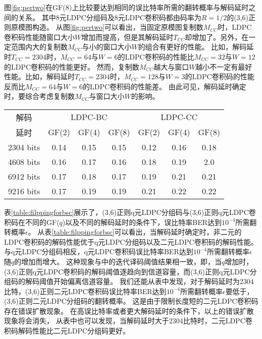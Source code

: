 图\ref{fig:pertwo}在GF($8$)上比较要达到相同的误比特率所需的翻转概率与解码延时之间的关系。
其中8元LDPC分组码及8元LDPC卷积码都由码率为$R=1/2$的(3,6)正则原模图构造。
从图\ref{fig:pertwo}可以看出，当固定原模图复制数$M_{CC}$时，LDPC卷积码性能随窗口大小$W$增加而提高，但是其解码延时$T_{CC}$却增加了。另外，在一定范围内大的复制数$M_{CC}$与小的窗口大小$W$的组合有更好的性能。
比如，解码延时$T_{CC}=2304$时，$M_{CC}=64$与$W=6$的LDPC卷积码的性能比$M_{CC}=32$与$W=12$的LDPC卷积码的性能更好。
然而，复制数$M_{CC}$越大与窗口$W$越小不一定有最好性能。比如，解码延时$T_{CC}=2304$时，$M_{CC}=128$与$W=3$的LDPC卷积码的性能反而比$M_{CC}=64$与$W=6$的LDPC卷积码的性能差。
由此可见，解码延时确定时，要综合考虑复制数$M_{CC}$与窗口大小$W$的影响。
\begin{center}
\label{table:filppingforbsc}
\begin{tabular}{|c|c|c|c|c|c|c|}
 \hline
解码 & \multicolumn{3}{|c|}{LDPC-BC} & \multicolumn{3}{|c|}{LDPC-CC} \\ \cline{2-7}
延时 & GF(2) & GF(4) & GF(8) & GF(2) & GF(4) & GF(8) \\ \hline
2304 bits & 0.14 & 0.15 & 0.15 & 0.12 & 0.16 & 0.18\\ \hline
4608 bits & 0.16 & 0.17 & 0.16 & 0.18 & 0.19 & 2.0\\ \hline
6912 bits & 0.17 & 0.18 & 0.17 & 0.19 & 0.21 & 0.21\\ \hline
9216 bits & 0.17 & 0.19 & 0.19 & 0.21 & 0.22 & 0.22\\ \hline
\end{tabular}
\end{center}

表\ref{table:filppingforbsc}展示了，(3,6)正则q元LDPC分组码与(3,6)正则q元LDPC卷积码在不同的GF($q$)以及不同的解码延时的条件下，误比特率BER达到$10^{-4}$所需翻转概率$\epsilon$。
从表\ref{table:filppingforbsc}可以看出，当解码延时确定时，非二元的LDPC卷积码的解码性能优于q元LDPC分组码以及二元LDPC卷积码的解码性能。
与q元LDPC分组码相反，q元LDPC卷积码误比特率BER达到$10^{-4}$所需翻转概率$\epsilon$随$q$的增加而增大。
这种现象与\parencite{6874959}中的迭代译码阈值结果相一致，即，当$q$增加时，(3,6)正则q元LDPC卷积码的解码阈值逐趋向到信道容量，而(3,6)正则q元LDPC分组码的解码阈值开始偏离信道容量。
我们还能从表中发现，对于解码延时为2304比特，(3,6)正则二元LDPC卷积码误比特率BER达到$10^{-4}$所需翻转概率$\epsilon$要低于，(3,6)正则二元LDPC分组码的翻转概率。
这是由于限制长度短的二元LDPC卷积码存在错误扩散现象。
在高误比特率或者更大解码延时的条件下，以上的错误扩散现象将会消失，
从表中也可以发现，当解码延时大于2304比特时，二元LDPC卷积码解码性能比二元LDPC分组码更好。




